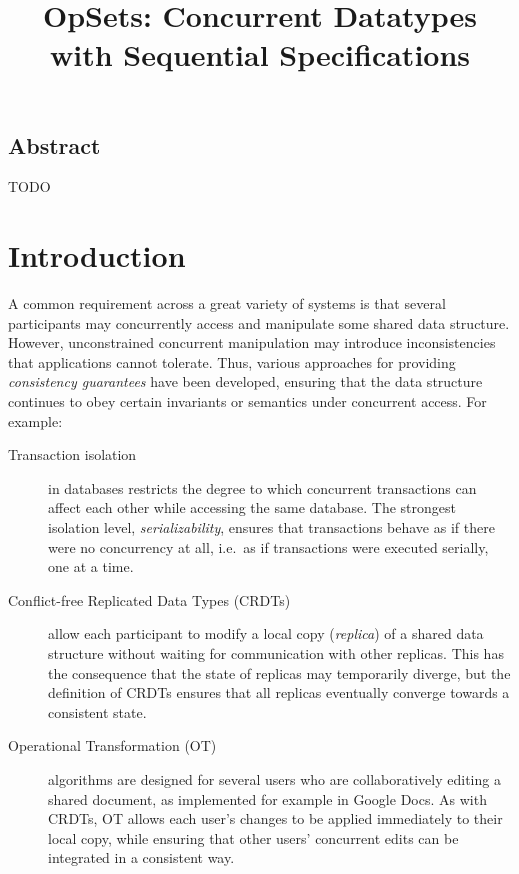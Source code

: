 \documentclass[twocolumn,10pt]{article}
\begin{document}
\sloppy
\title{OpSets: Concurrent Datatypes with Sequential Specifications}
\author{}
\date{}
\maketitle

\subsection*{Abstract}
TODO

\section{Introduction}

A common requirement across a great variety of systems is that several participants may concurrently access and manipulate some shared data structure.
However, unconstrained concurrent manipulation may introduce inconsistencies that applications cannot tolerate.
Thus, various approaches for providing \emph{consistency guarantees} have been developed, ensuring that the data structure continues to obey certain invariants or semantics under concurrent access. For example:

\begin{description}
\item[Transaction isolation] in databases restricts the degree to which concurrent transactions can affect each other while accessing the same database.
The strongest isolation level, \emph{serializability}, ensures that transactions behave as if there were no concurrency at all, i.e.\ as if transactions were executed serially, one at a time.

\item[Conflict-free Replicated Data Types (CRDTs)] allow each participant to modify a local copy (\emph{replica}) of a shared data structure without waiting for communication with other replicas.
This has the consequence that the state of replicas may temporarily diverge, but the definition of CRDTs ensures that all replicas eventually converge towards a consistent state.

\item[Operational Transformation (OT)] algorithms are designed for several users who are collaboratively editing a shared document, as implemented for example in Google Docs.
As with CRDTs, OT allows each user's changes to be applied immediately to their local copy, while ensuring that other users' concurrent edits can be integrated in a consistent way.
\end{description}
\end{document}
